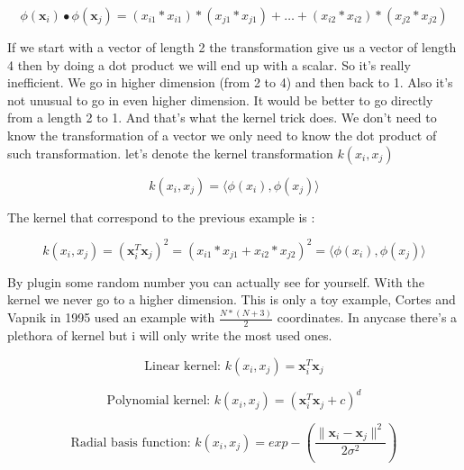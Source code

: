 \documentclass[a4paper,11pt]{article}
\numberwithin{equation}{section}
\begin{document}
\begin{equation*}
\phi(\boldsymbol{x}_i)\bullet\phi(\boldsymbol{x}_j) = (x_{i1}*x_{i1})*(x_{j1}*x_{j1}) + \dots + (x_{i2}*x_{i2})*(x_{j2}*x_{j2})
\end{equation*}

If we start with a vector of length 2 the transformation give us a vector of length 4 then by doing a dot product we will end up with a scalar. So it's really inefficient. We go in higher dimension (from 2 to 4) and then back to 1. Also it's not unusual to go in even higher dimension. It would be better to go directly from a length 2 to 1. And that's what the kernel trick does. We don't need to know the transformation of a vector we only need to know the dot product of such transformation. let's denote the kernel transformation $k(x_i,x_j)$

\begin{equation*}
 k(x_i,x_j) = \langle \phi(x_i),\phi(x_j) \rangle
\end{equation*}

The kernel that correspond to the previous example is :

\begin{equation*}
 k(x_i,x_j) = (\boldsymbol{x}^T_i\boldsymbol{x}_j)^2 = (x_{i1}*x_{j1} + x_{i2}*x_{j2})^2 =  \langle \phi(x_i),\phi(x_j) \rangle
\end{equation*}



By plugin some random number you can actually see for yourself. With the kernel we never go to a higher dimension. This is only a toy example, Cortes and Vapnik in 1995 used an example with $\frac{N*(N+3)}{2}$ coordinates. In anycase there's a plethora of kernel but i will only write the most used ones.



\begin{equation*}
\mbox{Linear kernel: } k(x_i,x_j) = \boldsymbol{x}^T_i\boldsymbol{x}_j
\end{equation*}

\begin{equation*}
\mbox{Polynomial kernel: } k(x_i,x_j) = (\boldsymbol{x}^T_i\boldsymbol{x}_j+c)^d
\end{equation*}


\begin{equation*}
\mbox{Radial basis function: } k(x_i,x_j) = exp-(\frac{\|\boldsymbol{x}_i -\boldsymbol{x}_j\|^2}{2\sigma^2}) 
\end{equation*}
\end{document}
